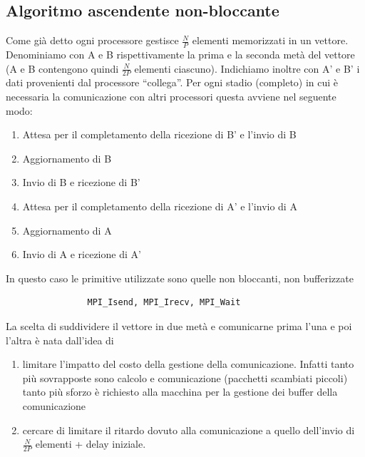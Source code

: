 \documentclass[12pt,a4paper,oneside,openright]{article}
\begin{document}
\subsection{Algoritmo ascendente non-bloccante}
\label{non-bloccante}
Come già detto ogni processore gestisce $\frac{N}{P}$ elementi memorizzati in un vettore.\\
Denominiamo con A e B rispettivamente la prima e la seconda metà del vettore (A e B contengono quindi $\frac{N}{2P}$ elementi ciascuno). Indichiamo inoltre con A' e B' i dati provenienti dal processore ``collega''.
Per ogni stadio (completo) in cui è necessaria la comunicazione con altri processori questa avviene nel seguente modo:
\begin{enumerate}
\item Attesa per il completamento della ricezione di B' e l'invio di B
\item Aggiornamento di B
\item Invio di B e ricezione di B' 
\item Attesa per il completamento della ricezione di A' e l'invio di A
\item Aggiornamento di A
\item Invio di A e ricezione di A'  
\end{enumerate}
In questo caso le primitive utilizzate sono quelle non bloccanti, non bufferizzate
\begin{center}
\begin{verbatim}
                MPI_Isend, MPI_Irecv, MPI_Wait 
\end{verbatim} 
\end{center}
La scelta di suddividere il vettore in due metà e comunicarne prima l'una e poi l'altra è nata dall'idea di
\begin{enumerate}
\item limitare l'impatto del costo della gestione della comunicazione. Infatti tanto più sovrapposte sono calcolo e comunicazione (pacchetti scambiati piccoli) tanto più sforzo è richiesto alla macchina per la gestione dei buffer della comunicazione
\item cercare di limitare il ritardo dovuto alla comunicazione a quello dell'invio di $\frac{N}{2P}$ elementi + delay iniziale. 
\end{enumerate}
\end{document}
